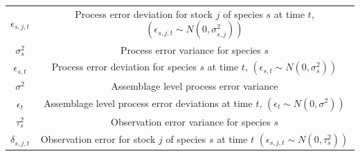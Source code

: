 \documentclass[]{scrartcl}
\begin{document}
\begin{table}[htbp]
\begin{center}
\begin{tabular}{c|c}
$\epsilon_{s,j,t}$ & Process error deviation for stock $j$ of species $s$ at time $t$, $\left( \epsilon_{s,j,t} \sim N (0, \sigma_{s,j}^2) \right)$ \\
$\sigma_{s}^2$ & Process error variance for species $s$ \\
$\epsilon_{s,t}$ & Process error deviation for species $s$ at time $t$, $\left( \epsilon_{s,t} \sim N (0, \sigma_s^2) \right)$ \\
$\sigma^2$ & Assemblage level process error variance  \\
$\epsilon_{t}$ & Assemblage level process error deviations at time $t$, $\left( \epsilon_{t} \sim N (0, \sigma^2) \right)$ \\
$\tau_s^2$ & Observation error variance for species $s$ \\
$\delta_{s,j,t}$ & Observation error for stock $j$ of species $s$ at time $t$ $\left(\epsilon_{s,j,t} \sim N (0, \tau_s^2) \right)$ \\
\hline
\end{tabular}
\end{center}
\end{table}

\newpage
\end{document}
